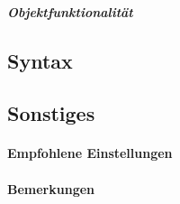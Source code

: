 
\newpage

\subparagraph{Objektfunktionalit\"at}


\newpage

\subsection{Syntax}

\subsection{Sonstiges}

\paragraph{Empfohlene Einstellungen}

\paragraph{Bemerkungen}
